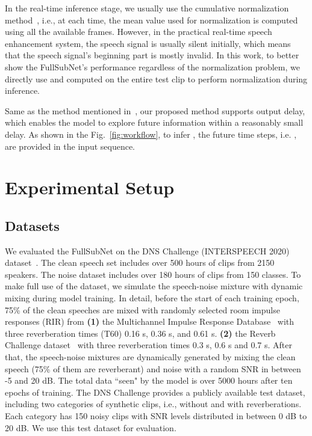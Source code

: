 \documentclass{article}
\begin{document}
In the real-time inference stage, we usually use the cumulative normalization method~\cite{conv_tasnet,DCCRN}, i.e., at each time, the mean value used for normalization is computed using all the available frames. 
However, in the practical real-time speech enhancement system, the speech signal is usually silent initially, which means that the speech signal's beginning part is mostly invalid. 
In this work, to better show the FullSubNet's performance regardless of the normalization problem, we directly use  and  computed on the entire test clip to perform normalization during inference.

Same as the method mentioned in~\cite{sub_dns_xiaofeili}, our proposed method supports output delay, which enables the model to explore future information within a reasonably small delay. As shown in the Fig.~\ref{fig:workflow}, to infer , the future time steps, i.e. , are provided in the input sequence.

\section{Experimental Setup}

\subsection{Datasets}
We evaluated the FullSubNet on the DNS Challenge (INTERSPEECH 2020) dataset~\cite{dns_challege}.
The clean speech set includes over 500 hours of clips from 2150 speakers. The noise dataset includes over 180 hours of clips from 150 classes.
To make full use of the dataset, we simulate the speech-noise mixture with dynamic mixing during model training.
In detail, before the start of each training epoch, 75\% of the clean speeches are mixed with randomly selected room impulse responses (RIR) from 
\textbf{(1)} the Multichannel Impulse Response Database~\cite{hadad2014multichannel_database} with three reverberation times (T60) 0.16 s, 0.36 s, and 0.61 s. \textbf{(2)} the Reverb Challenge dataset~\cite{kinoshita2016summary_database} with three reverberation times 0.3 s, 0.6 s and 0.7 s.
After that, the speech-noise mixtures are dynamically generated by mixing the clean speech (75\% of them are reverberant) and noise with a random SNR in between -5 and 20 dB. The total data ``seen" by the model is over 5000 hours after ten epochs of training.
The DNS Challenge provides a publicly available test dataset, including two categories of synthetic clips, i.e., without and with reverberations. Each category has 150 noisy clips with SNR levels distributed in between 0 dB to 20 dB.
We use this test dataset for evaluation.
\end{document}
